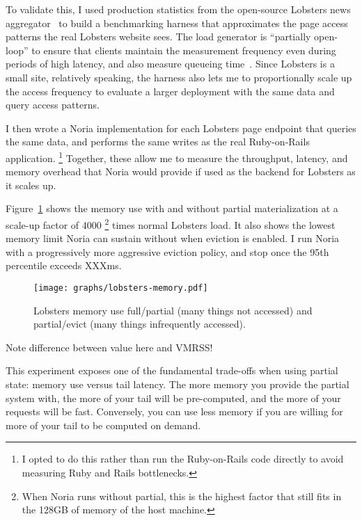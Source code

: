 To validate this, I used production statistics from the open-source Lobsters
news aggregator~\cite{lobsters,lobsters-data} to build a benchmarking harness
that approximates the page access patterns the real Lobsters website sees. The
load generator is ``partially open-loop'' to ensure that clients maintain the
measurement frequency even during periods of high latency, and also measure
queueing time~\cite{frank-open-loop,open-loop-cautionary-tale}. Since Lobsters
is a small site, relatively speaking, the harness also lets me to proportionally
scale up the access frequency to evaluate a larger deployment with the same
data and query access patterns.

I then wrote a Noria implementation for each Lobsters page endpoint that
queries the same data, and performs the same writes as the real Ruby-on-Rails
application.%
\footnote{I opted to do this rather than run the Ruby-on-Rails code directly to
avoid measuring Ruby and Rails bottlenecks.}
Together, these allow me to measure the throughput, latency, and memory overhead
that Noria would provide if used as the backend for Lobsters as it scales up.

Figure~\ref{f:lobsters-memory} shows the memory use with and without partial
materialization at a scale-up factor of 4000%
\footnote{When Noria runs without partial, this is the highest factor that still
fits in the 128GB of memory of the host machine.} times normal Lobsters load. It
also shows the lowest memory limit Noria can sustain without when eviction is
enabled. I run Noria with a progressively more aggressive eviction policy, and
stop once the 95th percentile exceeds XXXms.

\begin{figure}[h]
  \centering
  \texttt{[image: graphs/lobsters-memory.pdf]}
  \caption{Lobsters memory use full/partial (many things not accessed) and partial/evict (many things infrequently accessed).}
  \label{f:lobsters-memory}
\end{figure}

\begin{inprogress}
Note difference between value here and VMRSS!
\end{inprogress}

This experiment exposes one of the fundamental trade-offs when using partial
state: memory use versus tail latency. The more memory you provide the partial
system with, the more of your tail will be pre-computed, and the more of your
requests will be fast. Conversely, you can use less memory if you are willing
for more of your tail to be computed on demand.

